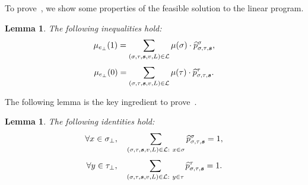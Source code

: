 \documentclass[11pt]{article}
\newtheorem{lemma}[theorem]{Lemma}
\newcommand{\seqS}{\boldsymbol{s}}
\begin{document}
To prove~, we show some properties of the feasible solution to the linear program.

\begin{lemma} \label{lem:ratio-identity}
    The following inequalities hold:
    \begin{align*}
        \mu_{e_{\bot}}(1) = \sum_{(\sigma, \tau, \seqS,v,L) \in \+L}\mu(\sigma)\cdot\widehat{p}_{\sigma, \tau, \seqS}^{\sigma},
    \end{align*}
    \begin{align*}
        \mu_{e_{\bot}}(0)  = \sum_{(\sigma, \tau, \seqS,v,L) \in \+L}\mu(\tau)\cdot\widehat{p}_{\sigma, \tau, \seqS}^{\tau}.
    \end{align*}
\end{lemma}

The following lemma is the key ingredient to prove~.

\begin{lemma} \label{lem:ratio-identity-partial}
The following identities hold:
    \begin{align}\label{eqn-sum-leftside}
        \forall x\in \sigma_\bot, \quad \sum_{(\sigma,\tau, \seqS,v,L)\in \+L: \ x\in \sigma} \widehat{p}^{\sigma}_{\sigma,\tau,\seqS}=1,
    \end{align}
    \begin{align}\label{eqn-sum-rightside}
        \forall y\in \tau_\bot, \quad \sum_{(\sigma,\tau, \seqS,v,L)\in \+L: \ y\in \tau} \widehat{p}^{\tau}_{\sigma,\tau, \seqS}=1.
    \end{align}
\end{lemma}
\end{document}
